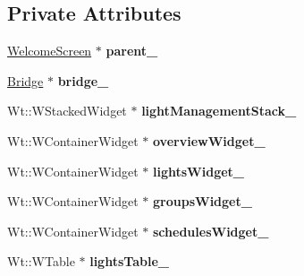 \subsection*{Private Attributes}
\begin{DoxyCompactItemize}
\item 
\hyperlink{classWelcomeScreen}{Welcome\+Screen} $\ast$ {\bfseries parent\+\_\+}\hypertarget{classLightManagementWidget_a6c29ac9c7547417b442219b962ca2195}{}\label{classLightManagementWidget_a6c29ac9c7547417b442219b962ca2195}

\item 
\hyperlink{classBridge}{Bridge} $\ast$ {\bfseries bridge\+\_\+}\hypertarget{classLightManagementWidget_af55628a2bfe170e6eb56a5630fdd947d}{}\label{classLightManagementWidget_af55628a2bfe170e6eb56a5630fdd947d}

\item 
Wt\+::\+W\+Stacked\+Widget $\ast$ {\bfseries light\+Management\+Stack\+\_\+}\hypertarget{classLightManagementWidget_ae46ca954b273cee2c4ad33bf31137f52}{}\label{classLightManagementWidget_ae46ca954b273cee2c4ad33bf31137f52}

\item 
Wt\+::\+W\+Container\+Widget $\ast$ {\bfseries overview\+Widget\+\_\+}\hypertarget{classLightManagementWidget_a1b1170bf380fc56c67870ecdb0129c27}{}\label{classLightManagementWidget_a1b1170bf380fc56c67870ecdb0129c27}

\item 
Wt\+::\+W\+Container\+Widget $\ast$ {\bfseries lights\+Widget\+\_\+}\hypertarget{classLightManagementWidget_a75b0f44814bba96f4c6c4e2168e2461b}{}\label{classLightManagementWidget_a75b0f44814bba96f4c6c4e2168e2461b}

\item 
Wt\+::\+W\+Container\+Widget $\ast$ {\bfseries groups\+Widget\+\_\+}\hypertarget{classLightManagementWidget_a141e40120063933b98c6dd73a0672d56}{}\label{classLightManagementWidget_a141e40120063933b98c6dd73a0672d56}

\item 
Wt\+::\+W\+Container\+Widget $\ast$ {\bfseries schedules\+Widget\+\_\+}\hypertarget{classLightManagementWidget_abf56d950683122a6f3fda911c4722dfe}{}\label{classLightManagementWidget_abf56d950683122a6f3fda911c4722dfe}

\item 
Wt\+::\+W\+Table $\ast$ {\bfseries lights\+Table\+\_\+}\hypertarget{classLightManagementWidget_a0abd3deb6e9263dc8ed1b3c77c88eb01}{}\label{classLightManagementWidget_a0abd3deb6e9263dc8ed1b3c77c88eb01}


\end{DoxyCompactItemize}
